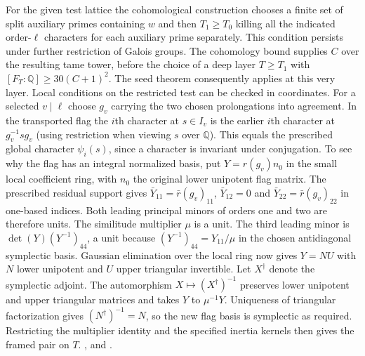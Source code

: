 For the given test lattice the cohomological construction chooses a
finite set of split auxiliary primes containing \(w\) and then
\(T_1\ge T_0\) killing all the indicated order-\(\ell\) characters
for each auxiliary prime separately. This condition
persists under further restriction of Galois groups. The cohomology
bound supplies \(C\) over the resulting tame tower, before the choice
of a deep layer \(T\ge T_1\) with \([F_T:\mathbb Q]\ge30(C+1)^2\).
The seed theorem consequently applies at this very layer. Local
conditions on the restricted test can be checked in coordinates.
For a selected \(v\mid\ell\) choose \(g_v\) carrying the two chosen
prolongations into agreement. In the transported flag the \(i\)th
character at \(s\in I_v\) is the earlier \(i\)th character at
\(g_v^{-1}s g_v\) (using restriction when viewing \(s\) over
\(\mathbb Q\)). This equals the prescribed global character
\(\psi_i(s)\), since a character is invariant under conjugation.
To see why the flag has an integral normalized basis, put
\(Y=r(g_v)n_0\) in the small local coefficient ring, with \(n_0\)
the original lower unipotent flag matrix. The prescribed residual
support gives \(\bar Y_{11}=\bar r(g_v)_{11}\),
\(\bar Y_{12}=0\) and \(\bar Y_{22}=\bar r(g_v)_{22}\) in one-based
indices. Both leading principal minors of orders one and two are
therefore units. The similitude multiplier \(\mu\) is a unit.
The third leading minor is \(\det(Y)(Y^{-1})_{44}\), a unit because
\((Y^{-1})_{44}=Y_{11}/\mu\) in the chosen antidiagonal
symplectic basis. Gaussian elimination over the local ring now
gives \(Y=NU\) with \(N\) lower unipotent and \(U\) upper triangular
invertible. Let \(X^\dagger\) denote the symplectic adjoint.
The automorphism \(X\mapsto(X^\dagger)^{-1}\) preserves lower
unipotent and upper triangular matrices and takes \(Y\) to
\(\mu^{-1}Y\). Uniqueness of triangular factorization gives
\((N^\dagger)^{-1}=N\), so the new flag basis is symplectic as
required. Restricting the multiplier identity and the
specified inertia kernels then gives the framed pair on \(T\).
,
and .

